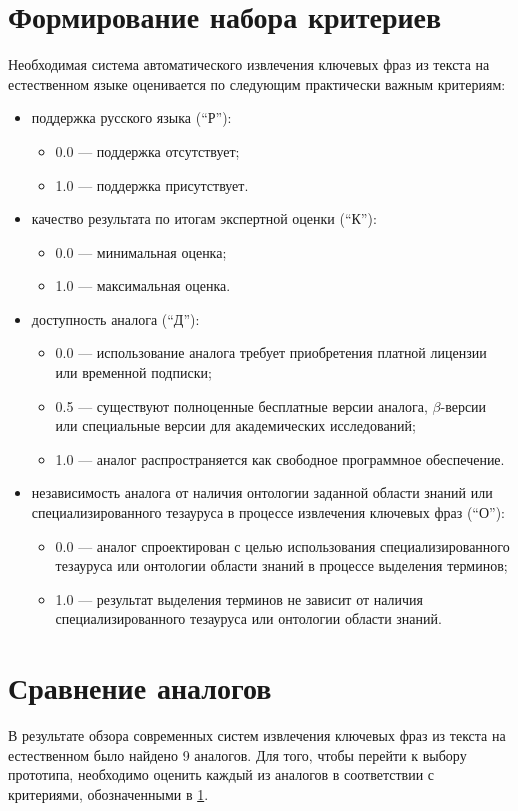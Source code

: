 \section{Формирование набора критериев}
\label{sec:Criteria}
Необходимая система автоматического извлечения ключевых фраз из текста
на естественном языке оценивается по следующим практически
важным критериям:
\begin{itemize}
  \item поддержка русского языка (``Р''):
  \begin{itemize}
    \item 0.0 — поддержка отсутствует;
    \item 1.0 — поддержка присутствует.
  \end{itemize}
  \item качество результата по итогам экспертной оценки (``К''):
  \begin{itemize}
    \item 0.0 — минимальная оценка;
    \item 1.0 — максимальная оценка.
  \end{itemize}
  \item доступность аналога (``Д''):
  \begin{itemize}
    \item 0.0 — использование аналога требует приобретения платной
лицензии или временной подписки;
    \item 0.5 — существуют полноценные бесплатные версии аналога,
$\beta$-версии или специальные версии для академических исследований;
    \item 1.0 — аналог распространяется как
свободное программное обеспечение.
  \end{itemize}
  \item независимость аналога от наличия онтологии заданной
области знаний или специализированного тезауруса в процессе
извлечения ключевых фраз (``О''):
  \begin{itemize}
    \item 0.0 — аналог спроектирован с целью использования
специализированного тезауруса или онтологии области знаний
в процессе выделения терминов;
    \item 1.0 — результат выделения терминов не зависит от
наличия специализированного тезауруса или онтологии области
знаний.
  \end{itemize}
\end{itemize}

\section{Сравнение аналогов}
В результате обзора современных систем извлечения ключевых
фраз из текста на естественном было найдено 9 аналогов.
Для того, чтобы перейти к выбору прототипа, необходимо оценить
каждый из аналогов в соответствии с критериями, обозначенными
в \ref{sec:Criteria}.

